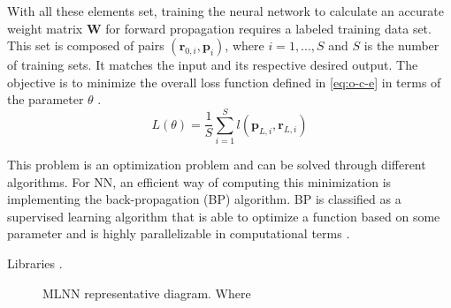 \documentclass[conference]{IEEEtran}
\begin{document}
With all these elements set, training the neural network to calculate an accurate weight matrix $\textbf{W}$ for forward propagation requires a labeled training data set. This set is composed of pairs $ (\textbf{r}_{0,i}, \textbf{p}_i) $, where $i=1,...,S$ and $S$ is the number of training sets. It matches the input and its respective desired output. The objective is to minimize the overall loss function defined in \eqref{eq:o-c-e} in terms of the parameter $\theta$ \cite{b2}. 
\begin{equation}\label{eq:o-c-e}
L\left( \theta \right) =\dfrac {1}{S}\sum ^{S}_{i=1}l\left( \textbf{p}_{L,i},\textbf{r}_{L,i}\right)	
\end{equation}  

This problem is an optimization problem and can be solved through different algorithms. For NN, an efficient way of computing this minimization is implementing the back-propagation (BP) algorithm. 	BP is classified as a supervised learning algorithm that is able to optimize a function based on some parameter and is highly parallelizable in computational terms \cite{b8}\cite{b9}.


Libraries \cite{b11} \cite{b12}.



\begin{figure}
\centering


\caption{MLNN representative diagram. Where } \label{fig:NN}
\end{figure}
\end{document}
